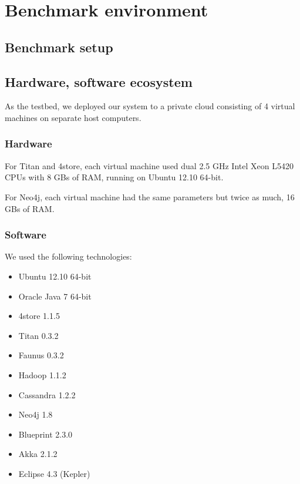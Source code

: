 \section{Benchmark environment}
\label{sec:benchmark-environment}


\subsection{Benchmark setup}


\subsection{Hardware, software ecosystem}

As the testbed, we deployed our system to a private cloud consisting of 4 virtual machines on separate host computers. 

\subsubsection{Hardware}

For Titan and 4store, each virtual machine used dual 2.5 GHz Intel Xeon L5420 CPUs with 8 GBs of RAM, running on Ubuntu 12.10 64-bit.

For Neo4j, each virtual machine had the same parameters but twice as much, 16 GBs of RAM. 

\subsubsection{Software}

We used the following technologies:

\begin{itemize}
  \item Ubuntu 12.10 64-bit
  \item Oracle Java 7 64-bit
  \item 4store 1.1.5
  \item Titan 0.3.2
  \item Faunus 0.3.2
  \item Hadoop 1.1.2
  \item Cassandra 1.2.2
  \item Neo4j 1.8
  \item Blueprint 2.3.0
  \item Akka 2.1.2
  \item Eclipse 4.3 (Kepler)
\end{itemize}

